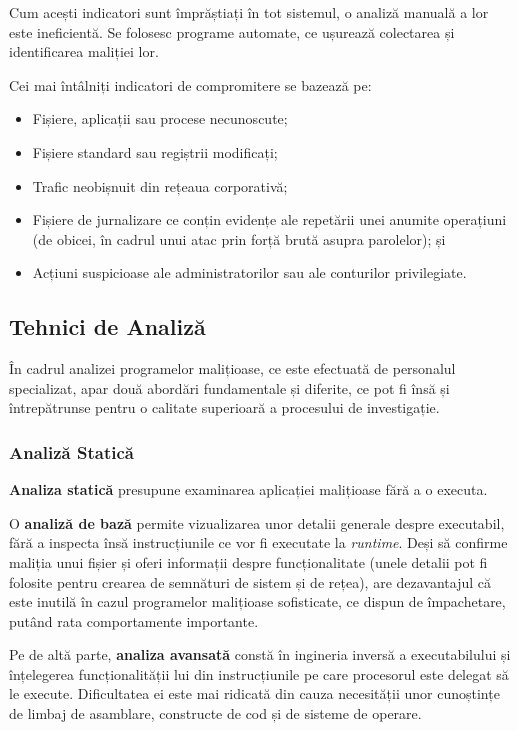 \documentclass[../../main.tex]{subfiles}
\begin{document}
Cum acești indicatori sunt împrăștiați în tot sistemul, o analiză manuală a lor este ineficientă. Se folosesc programe automate, ce ușurează colectarea și identificarea maliției lor.

Cei mai întâlniți indicatori de compromitere se bazează pe:
\begin{itemize}
    \item Fișiere, aplicații sau procese necunoscute;
    \item Fișiere standard sau regiștrii modificați;
    \item Trafic neobișnuit din rețeaua corporativă;
    \item Fișiere de jurnalizare ce conțin evidențe ale repetării unei anumite opera\-țiuni (de obicei, în cadrul unui atac prin forță brută asupra parolelor); și
    \item Acțiuni suspicioase ale administratorilor sau ale conturilor privilegiate.
\end{itemize}

\subsection{Tehnici de Analiză}

În cadrul analizei programelor malițioase, ce este efectuată de personalul speci\-alizat, apar două abordări fundamentale și diferite, ce pot fi însă și întrepătrunse pentru o calitate superioară a procesului de investigație.

\subsubsection{Analiză Statică}

\textbf{Analiza statică} presupune examinarea aplicației malițioase fără a o executa.

O \textbf{analiză de bază} permite vizualizarea unor detalii generale despre executabil, fără a inspecta însă instrucțiunile ce vor fi executate la \textit{runtime}. Deși să confirme maliția unui fișier și oferi informații despre funcționalitate (unele detalii pot fi folosite pentru crearea de semnături de sistem și de rețea), are dezavantajul că este inutilă în cazul programelor malițioase sofisticate, ce dispun de împachetare, putând rata comportamente importante.

Pe de altă parte, \textbf{analiza avansată} constă în ingineria inversă a executabilului și înțelegerea funcționalității lui din instrucțiunile pe care procesorul este delegat să le execute. Dificultatea ei este mai ridicată din cauza necesității unor cunoștințe de limbaj de asamblare, constructe de cod și de sisteme de operare.
\end{document}
